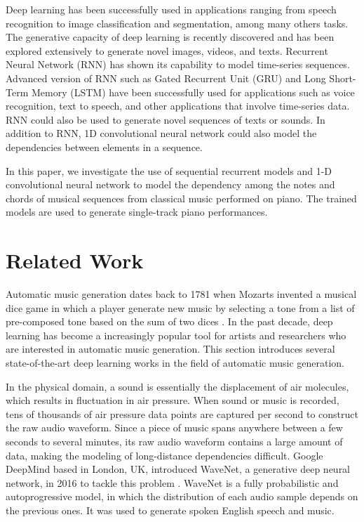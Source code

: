 \documentclass[sigconf,authorversion]{acmart}
\begin{document}
Deep learning has been successfully used in applications ranging from speech
recognition to image classification and segmentation, among many others tasks.
The generative capacity of deep learning is recently discovered and has been
explored extensively to generate novel images, videos, and texts.
Recurrent Neural Network (RNN) has shown its capability to
model time-series sequences. Advanced version of RNN such as Gated Recurrent 
Unit (GRU) and Long Short-Term Memory (LSTM) have been successfully used for 
applications such as voice recognition, text to speech, and other applications 
that involve time-series data. RNN could also be used to generate novel 
sequences of texts or sounds. In addition to RNN, 1D convolutional neural network
could also model the dependencies between elements in a sequence.

In this paper, we investigate the use of sequential recurrent models and 1-D 
convolutional neural network to model the dependency among the notes and chords
of musical sequences from classical music performed on piano. The trained models 
are used to generate single-track piano performances.

\section{Related Work}

Automatic music generation dates back to 1781 when Mozarts invented 
a musical dice game in which a player generate new music by selecting
a tone from a list of pre-composed tone based on the sum of two dices 
\cite{enwiki:995309040}. In the past decade, deep learning has become
a increasingly popular tool for artists and researchers who are interested in automatic 
music generation. This section introduces several state-of-the-art deep learning 
works in the field of automatic music generation.

In the physical domain, a sound is essentially the displacement of air molecules,
which results in fluctuation in air pressure. When sound or music is recorded,
tens of thousands of air pressure data points are captured per second to
construct the raw audio waveform. Since a piece of music spans anywhere between 
a few seconds to several minutes, its raw audio waveform contains a large amount
of data, making the modeling of long-distance dependencies difficult. Google DeepMind
based in London, UK, introduced WaveNet, a generative deep neural network, in 2016
to tackle this problem \cite{oord_wavenet_2016}. WaveNet is a fully probabilistic
and autoprogressive model, in which the distribution of each audio sample depends on 
the previous ones. It was used to generate spoken English speech and music.
\end{document}
